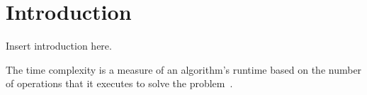 \section{Introduction} %
Insert introduction here.

The time complexity is a measure of an algorithm's runtime
based on the number of operations that it executes to solve the
problem~\cite{Cormen2009}.
